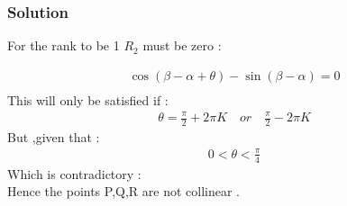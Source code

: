 \documentclass{beamer}
\begin{document}
\begin{frame}
\frametitle{Solution}

For the rank to be 1 $R_2$ must be zero :

\begin{align}
   \cos(\beta - \alpha + \theta) - \sin(\beta - \alpha) = 0\\
\end{align}
This will only be satisfied if  :
\begin{align}
    \theta = \frac{\pi}{2} + 2\pi K \quad or  \quad \frac{\pi}{2} - 2\pi K
\end{align}
But ,given that :
\begin{align}
    0 < \theta < \frac{\pi}{4}
\end{align}
Which is contradictory :\\
Hence the points P,Q,R are not collinear .


\end{frame}
\end{document}
